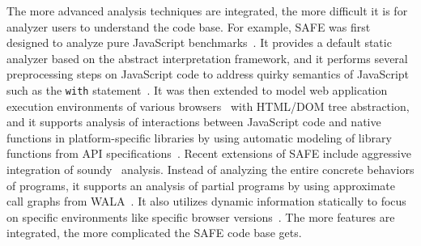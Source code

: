 \documentclass[10pt, conference]{IEEEtran}
\newcommand{\mtt}[1]{\texttt{\small #1}}
\begin{document}
The more advanced analysis techniques are integrated,
the more difficult it is for analyzer users to understand the code base.
For example, SAFE was first designed to analyze pure
JavaScript benchmarks~\cite{Lee12}.  It provides a default static analyzer
based on the abstract interpretation framework, and it 
performs several preprocessing steps on JavaScript code to
address quirky semantics of JavaScript such as the \mtt{with}
statement~\cite{dls13}.
It was then extended to model web application execution environments
of various browsers~\cite{jswapp} with HTML/DOM tree abstraction,
and it supports analysis of interactions between JavaScript code
and native functions in platform-specific libraries by using automatic
modeling of library functions from API specifications~\cite{SAFEWAPI}.
Recent extensions of SAFE include aggressive integration of
soundy~\cite{soundy} analysis.  Instead of analyzing the entire concrete
behaviors of programs, it supports an analysis of partial
programs by using approximate call graphs from WALA~\cite{asewala}.
It also utilizes dynamic information statically to focus on specific
environments like specific browser versions~\cite{safehybrid}.
The more features are integrated, the more complicated the SAFE code base gets.
\end{document}
